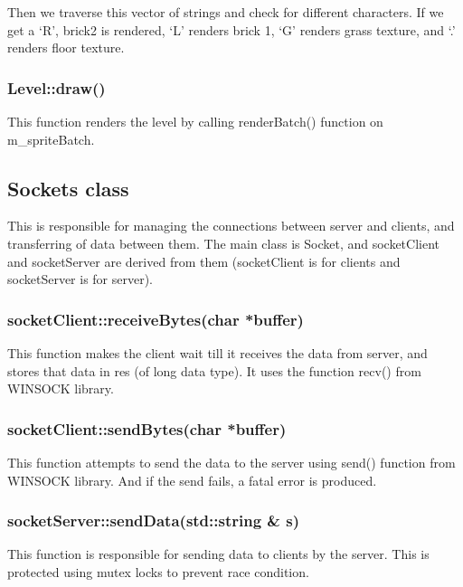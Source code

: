 \documentclass{article}
\begin{document}
Then we traverse this vector of strings and check for different characters. If we get a ‘R’, brick2 is rendered, ‘L’ renders brick 1, ‘G’ renders grass texture, and ‘.’ renders floor texture. \\
\newline

\subsubsection{Level::draw()}
This function renders the level by calling renderBatch() function on m\_spriteBatch. \newline

\subsection{Sockets class}
This is responsible for managing the connections between server and clients, and transferring of data between them. The main class is Socket, and socketClient and socketServer are derived from them (socketClient is for clients and socketServer is for server).
\newline

\subsubsection{socketClient::receiveBytes(char *buffer)}
This function makes the client wait till it receives the data from server, and stores that data in res (of long data type). It uses the function recv() from WINSOCK library.
\newline

\subsubsection{socketClient::sendBytes(char *buffer) }
This function attempts to send the data to the server using send() function from WINSOCK library. And if the send fails, a fatal error is produced.
\newline

\subsubsection{socketServer::sendData(std::string & s)}
This function is responsible for sending data to clients by the server. This is protected using mutex locks to prevent race condition.
\newline
\end{document}
